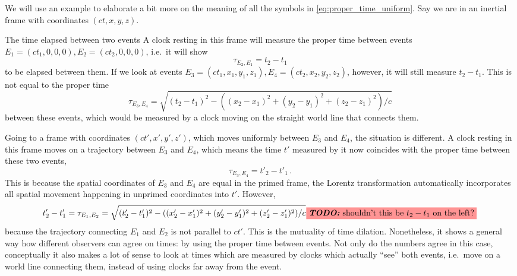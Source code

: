 \documentclass[../relativity_main.tex]{subfiles}
\begin{document}
\begin{ex}
	We will use an example to elaborate a bit more on the meaning of all the symbols in \eqref{eq:proper_time_uniform}. Say we are in an inertial frame with coordinates $(ct, x, y, z)$. 
	
	The time elapsed between two events 
	A clock resting in this frame will measure the proper time between events $E_1 = (ct_1, 0, 0, 0), E_2 = (ct_2, 0, 0, 0)$, i.e.~it will show
	\begin{equation*}
		\tau_{E_2, E_1} = t_2 - t_1
	\end{equation*}
	to be elapsed between them. If we look at events $E_3 = (ct_1, x_1, y_1, z_1), E_4 = (ct_2, x_2, y_2, z_2)$, however, it will still measure $t_2 - t_1$. This is not equal to the proper time
	\begin{equation*}
		\tau_{E_3, E_4} = \sqrt{(t_2 - t_1)^2 - ((x_2 - x_1)^2 + (y_2 - y_1)^2 + (z_2 - z_1)^2) / c}
	\end{equation*}
	between these events, which would be measured by a clock moving on the straight world line that connects them.
	
	
	
	Going to a frame with coordinates $(ct', x', y', z')$, which moves uniformly between $E_3$ and $E_4$, the situation is different. A clock resting in this frame moves on a trajectory between $E_3$ and $E_4$, which means the time $t'$ measured by it now coincides with the proper time between these two events,
	\begin{equation*}
		\tau_{E_3, E_4} = t'_2 - t'_1 \, .
	\end{equation*}
	This is because the spatial coordinates of $E_3$ and $E_4$ are equal in the primed frame, the Lorentz transformation automatically incorporates all spatial movement happening in unprimed coordinates into $t'$. However,
	\begin{equation*}
		t'_2 - t'_1 = \tau_{E_1, E_2} = \sqrt{(t'_2 - t'_1)^2 - ((x'_2 - x'_1)^2 + (y'_2 - y'_1)^2 + (z'_2 - z'_1)^2) / c} \todo{shouldn't this be $t_2 - t_1$ on the left?}
	\end{equation*}
	because the trajectory connecting $E_1$ and $E_2$ is not parallel to $ct'$. This is the mutuality of time dilation. Nonetheless, it shows a general way how different observers can agree on times: by using the proper time between events. Not only do the numbers agree in this case, conceptually it also makes a lot of sense to look at times which are measured by clocks which actually \enquote{see} both events, i.e.~move on a world line connecting them, instead of using clocks far away from the event.\\
	

\end{ex}
\end{document}
